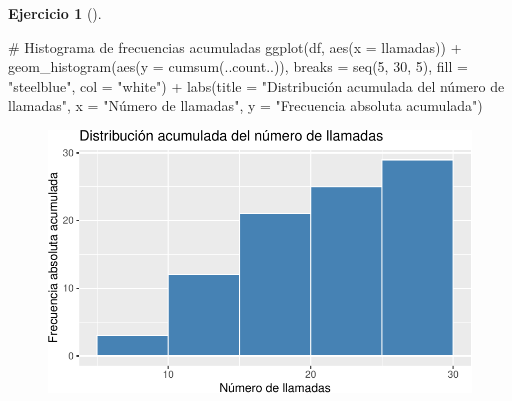 \documentclass[
  a4paper,
]{scrreport}
\newenvironment{Shaded}{\begin{snugshade}}{\end{snugshade}}
\newcommand{\AttributeTok}[1]{\textcolor[rgb]{0.40,0.45,0.13}{#1}}
\newcommand{\CommentTok}[1]{\textcolor[rgb]{0.37,0.37,0.37}{#1}}
\newcommand{\DecValTok}[1]{\textcolor[rgb]{0.68,0.00,0.00}{#1}}
\newcommand{\FunctionTok}[1]{\textcolor[rgb]{0.28,0.35,0.67}{#1}}
\newcommand{\NormalTok}[1]{\textcolor[rgb]{0.00,0.23,0.31}{#1}}
\newcommand{\SpecialCharTok}[1]{\textcolor[rgb]{0.37,0.37,0.37}{#1}}
\newcommand{\StringTok}[1]{\textcolor[rgb]{0.13,0.47,0.30}{#1}}
\theoremstyle{definition}
\newtheorem{exercise}{Ejercicio}[chapter]
\theoremstyle{remark}
\begin{document}
\begin{exercise}[]
\begin{tcolorbox}
\begin{Shaded}
\begin{Highlighting}[]
\CommentTok{\# Histograma de frecuencias acumuladas}
\FunctionTok{ggplot}\NormalTok{(df, }\FunctionTok{aes}\NormalTok{(}\AttributeTok{x =}\NormalTok{ llamadas)) }\SpecialCharTok{+}
    \FunctionTok{geom\_histogram}\NormalTok{(}\FunctionTok{aes}\NormalTok{(}\AttributeTok{y =} \FunctionTok{cumsum}\NormalTok{(..count..)), }\AttributeTok{breaks =} \FunctionTok{seq}\NormalTok{(}\DecValTok{5}\NormalTok{, }\DecValTok{30}\NormalTok{, }\DecValTok{5}\NormalTok{), }\AttributeTok{fill =} \StringTok{"steelblue"}\NormalTok{, }\AttributeTok{col =} \StringTok{"white"}\NormalTok{) }\SpecialCharTok{+}
    \FunctionTok{labs}\NormalTok{(}\AttributeTok{title =} \StringTok{"Distribución acumulada del número de llamadas"}\NormalTok{, }\AttributeTok{x =} \StringTok{"Número de llamadas"}\NormalTok{, }\AttributeTok{y =} \StringTok{"Frecuencia absoluta acumulada"}\NormalTok{)}
\end{Highlighting}
\end{Shaded}

\begin{figure}[H]

{\centering \includegraphics{./03-frecuencias-graficos_files/figure-pdf/unnamed-chunk-19-3.pdf}

}

\end{figure}


\end{tcolorbox}
\end{exercise}
\end{document}
